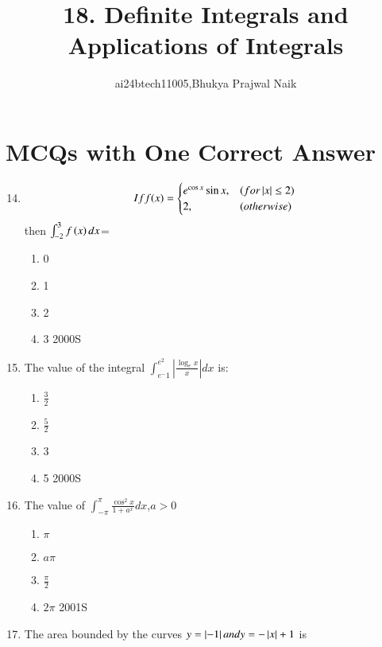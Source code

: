 \documentclass[journal,12pt,twocolumn]{IEEEtran}
\theoremstyle{remark}
\begin{document}

\vspace{3cm}

\title{18. Definite Integrals and Applications of Integrals}
\author{ai24btech11005,Bhukya Prajwal Naik}
\maketitle
\section{MCQs with One Correct Answer}

\begin{enumerate}
\setcounter{enumi}{13}   
\item
\begin{equation}
If f(x) = 
\begin{cases}
	e^{\cos x}\sin x, & \text(for \left\vert x\right\vert \leq 2)\\
 	2, & \text(otherwise)\\
\end{cases}
\end{equation}
then $\int_{-2}^{3}f\left(x\right) dx$=
\begin{enumerate}
    \item 0
    \item 1
    \item 2
    \item 3
    \hfill{{2000S}}
\end{enumerate}
\item The value of the integral $\int_{e^-1}^{e^2}\left|\frac{\log_e x}{x}\right| dx$ is:
\begin{enumerate}
	\item $\frac{3}{2}$
	\item $\frac{5}{2}$
    \item  3
    \item  5
    \hfill{{2000S}}
\end{enumerate}
\item The value of $\int_{-\pi}^{\pi}\frac{\cos^2 x}{1+a^ x } dx$,$a>0$
\begin{enumerate}
    \item$\pi$
    \item $a\pi$
    \item $\frac{\pi}{2}$
    \item $2\pi$
    \hfill{{2001S}}
\end{enumerate}
\item The area bounded by the curves $y=\left\vert-1\right\vert and y=-\left\vert x\right\vert+1$ is

\end{enumerate}
\end{document}
